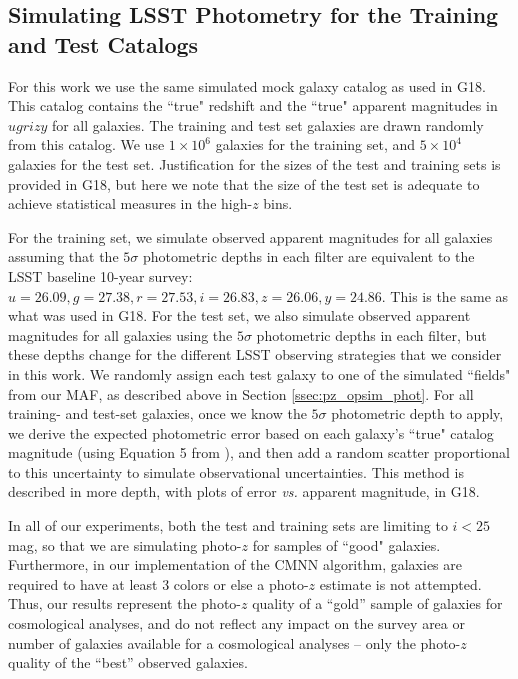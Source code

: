 \subsection{Simulating LSST Photometry for the Training and Test Catalogs} \label{ssec:pz_exp_cats}

For this work we use the same simulated mock galaxy catalog as used in G18. This catalog contains the ``true" redshift and the ``true" apparent magnitudes in $ugrizy$ for all galaxies. The training and test set galaxies are drawn randomly from this catalog. We use $1\times10^6$ galaxies for the training set, and $5\times10^4$ galaxies for the test set. Justification for the sizes of the test and training sets is provided in G18, but here we note that the size of the test set is adequate to achieve statistical measures in the high-$z$ bins.

For the training set, we simulate observed apparent magnitudes for all galaxies assuming that the $5{\sigma}$ photometric depths in each filter are equivalent to the LSST baseline 10-year survey: $u=26.09,g=27.38,r=27.53,i=26.83,z=26.06,y=24.86$. This is the same as what was used in G18. For the test set, we also simulate observed apparent magnitudes for all galaxies using the $5{\sigma}$ photometric depths in each filter, but these depths change for the different LSST observing strategies that we consider in this work. We randomly assign each test galaxy to one of the simulated ``fields" from our MAF, as described above in Section \ref{ssec:pz_opsim_phot}. For all training- and test-set galaxies, once we know the $5{\sigma}$ photometric depth to apply, we derive the expected photometric error based on each galaxy's ``true" catalog magnitude (using Equation 5 from \citealt{2008arXiv0805.2366I}), and then add a random scatter proportional to this uncertainty to simulate observational uncertainties. This method is described in more depth, with plots of error {\it vs.} apparent magnitude, in G18.

In all of our experiments, both the test and training sets are limiting to $i<25$ mag, so that we are simulating photo-$z$ for samples of ``good" galaxies. Furthermore, in our implementation of the CMNN algorithm, galaxies are required to have at least 3 colors or else a photo-$z$ estimate is not attempted. Thus, our results represent the photo-$z$ quality of a ``gold'' sample of galaxies for cosmological analyses, and do not reflect any impact on the survey area or number of galaxies available for a cosmological analyses -- only the photo-$z$ quality of the ``best'' observed galaxies.


